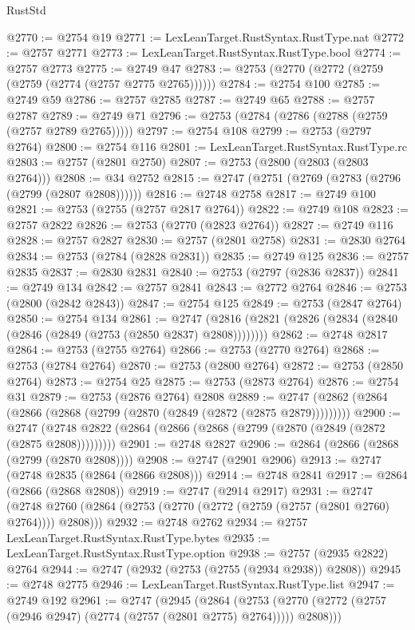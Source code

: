 \begin{lexlean}{RustStd}
\begin{coremodule}
@2770 := @2754 @19
@2771 := LexLeanTarget.RustSyntax.RustType.nat
@2772 := @2757 @2771
@2773 := LexLeanTarget.RustSyntax.RustType.bool
@2774 := @2757 @2773
@2775 := @2749 @47
@2783 := @2753 (@2770 (@2772 (@2759 (@2759 (@2774 (@2757 @2775 @2765))))))
@2784 := @2754 @100
@2785 := @2749 @59
@2786 := @2757 @2785
@2787 := @2749 @65
@2788 := @2757 @2787
@2789 := @2749 @71
@2796 := @2753 (@2784 (@2786 (@2788 (@2759 (@2757 @2789 @2765)))))
@2797 := @2754 @108
@2799 := @2753 (@2797 @2764)
@2800 := @2754 @116
@2801 := LexLeanTarget.RustSyntax.RustType.rc
@2803 := @2757 (@2801 @2750)
@2807 := @2753 (@2800 (@2803 (@2803 @2764)))
@2808 := @34 @2752
@2815 := @2747 (@2751 (@2769 (@2783 (@2796 (@2799 (@2807 @2808))))))
@2816 := @2748 @2758
@2817 := @2749 @100
@2821 := @2753 (@2755 (@2757 @2817 @2764))
@2822 := @2749 @108
@2823 := @2757 @2822
@2826 := @2753 (@2770 (@2823 @2764))
@2827 := @2749 @116
@2828 := @2757 @2827
@2830 := @2757 (@2801 @2758)
@2831 := @2830 @2764
@2834 := @2753 (@2784 (@2828 @2831))
@2835 := @2749 @125
@2836 := @2757 @2835
@2837 := @2830 @2831
@2840 := @2753 (@2797 (@2836 @2837))
@2841 := @2749 @134
@2842 := @2757 @2841
@2843 := @2772 @2764
@2846 := @2753 (@2800 (@2842 @2843))
@2847 := @2754 @125
@2849 := @2753 (@2847 @2764)
@2850 := @2754 @134
@2861 := @2747 (@2816 (@2821 (@2826 (@2834 (@2840 (@2846 (@2849 (@2753 (@2850 @2837) @2808))))))))
@2862 := @2748 @2817
@2864 := @2753 (@2755 @2764)
@2866 := @2753 (@2770 @2764)
@2868 := @2753 (@2784 @2764)
@2870 := @2753 (@2800 @2764)
@2872 := @2753 (@2850 @2764)
@2873 := @2754 @25
@2875 := @2753 (@2873 @2764)
@2876 := @2754 @31
@2879 := @2753 (@2876 @2764) @2808
@2889 := @2747 (@2862 (@2864 (@2866 (@2868 (@2799 (@2870 (@2849 (@2872 (@2875 @2879)))))))))
@2900 := @2747 (@2748 @2822 (@2864 (@2866 (@2868 (@2799 (@2870 (@2849 (@2872 (@2875 @2808)))))))))
@2901 := @2748 @2827
@2906 := @2864 (@2866 (@2868 (@2799 (@2870 @2808))))
@2908 := @2747 (@2901 @2906)
@2913 := @2747 (@2748 @2835 (@2864 (@2866 @2808)))
@2914 := @2748 @2841
@2917 := @2864 (@2866 (@2868 @2808))
@2919 := @2747 (@2914 @2917)
@2931 := @2747
    (@2748 @2760 (@2864 (@2753 (@2770 (@2772 (@2759 (@2757 (@2801 @2760) @2764)))) @2808)))
@2932 := @2748 @2762
@2934 := @2757 LexLeanTarget.RustSyntax.RustType.bytes
@2935 := LexLeanTarget.RustSyntax.RustType.option
@2938 := @2757 (@2935 @2822) @2764
@2944 := @2747 (@2932 (@2753 (@2755 (@2934 @2938)) @2808))
@2945 := @2748 @2775
@2946 := LexLeanTarget.RustSyntax.RustType.list
@2947 := @2749 @192
@2961 := @2747
    (@2945
      (@2864
        (@2753 (@2770 (@2772 (@2757 (@2946 @2947) (@2774 (@2757 (@2801 @2775) @2764))))) @2808)))

\end{coremodule}
\end{lexlean}
